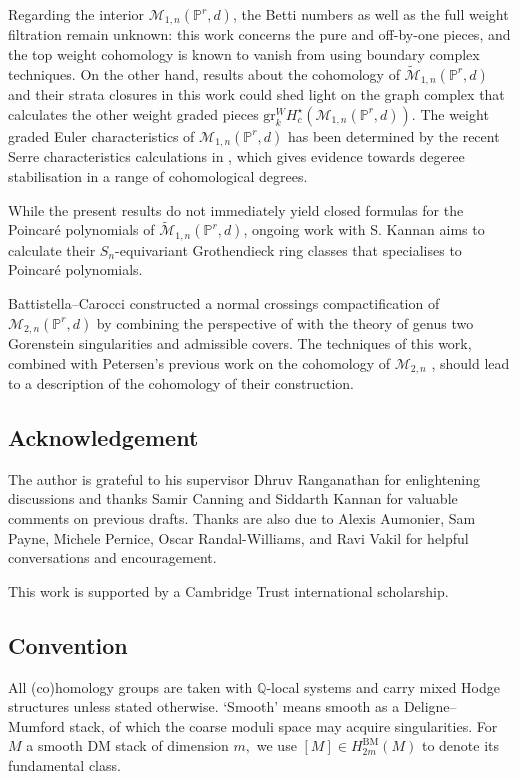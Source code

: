 \documentclass[12pt,reqno]{amsart}
\theoremstyle{definition}
\theoremstyle{definition}
\theoremstyle{definition}
\theoremstyle{definition}
\newcommand{\PP}{\mathbb{P}}
\newcommand{\Mtil}{\widetilde{\mathcal{M}}}
\begin{document}
Regarding the interior $\mathcal{M}_{1,n}(\mathbb{P}^r,d)$, the Betti numbers as well as the full weight filtration remain unknown: this work concerns the pure and off-by-one pieces, and the top weight cohomology is known to vanish from \cite{vzdualcomplex} using boundary complex techniques. On the other hand, results about the cohomology of $\Mtil_{1,n}(\PP^r,d)$ and their strata closures in this work could shed light on the graph complex that calculates the other weight graded pieces $\mathrm{gr}^W_k H_c^\star(\mathcal{M}_{1,n}(\PP^r,d)).$ The weight graded Euler characteristics of $\mathcal{M}_{1,n}(\PP^r,d )$ has been determined by the recent Serre characteristics calculations in \cite{virtualhodge}, which gives evidence towards degeree stabilisation in a range of cohomological degrees.

While the present results do not immediately yield closed formulas for the Poincaré polynomials of $\Mtil_{1,n}(\PP^r,d)$, ongoing work with S. Kannan aims to calculate their $S_n$-equivariant Grothendieck ring classes that specialises to Poincaré polynomials. 

Battistella--Carocci \cite{battistellacarocci} constructed a normal crossings compactification of $\mathcal{M}_{2,n}(\mathbb{P}^r,d)$ by combining the perspective of \cite{rspw} with the theory of genus two Gorenstein singularities and admissible covers. The techniques of this work, combined with Petersen's previous work on the cohomology of $\mathcal{M}_{2,n}$ \cite{PetA2, PetM2ct}, should lead to a description of the cohomology of their construction.

\subsection*{Acknowledgement} The author is grateful to his supervisor Dhruv Ranganathan for enlightening discussions and thanks Samir Canning and Siddarth Kannan for valuable comments on previous drafts. Thanks are also due to Alexis Aumonier, Sam Payne, Michele Pernice, Oscar Randal-Williams, and Ravi Vakil for helpful conversations and encouragement.

This work is supported by a Cambridge Trust international scholarship.

\subsection*{Convention} All (co)homology groups are taken with $\mathbb{Q}$-local systems and carry mixed Hodge structures unless stated otherwise. `Smooth' means smooth as a Deligne--Mumford stack, of which the coarse moduli space may acquire singularities. For $M$ a smooth DM stack of dimension $m,$ we use $[M]\in H_{2m}^{\mathrm{BM}}(M)$ to denote its fundamental class.
\end{document}
